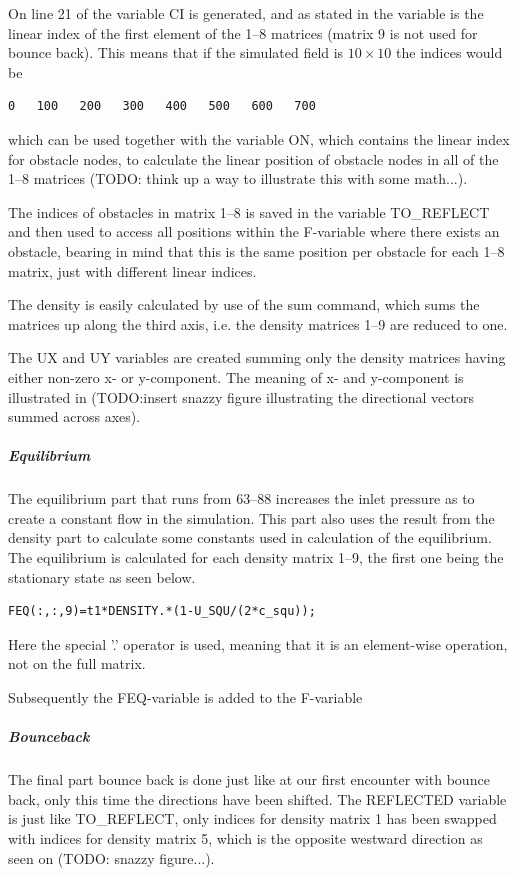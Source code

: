 On line 21 of  the variable CI is generated, and as stated in  the variable is the linear index of the first element of the 1--8 matrices (matrix 9 is not used for bounce back). This means that if the simulated field is $10\times10$ the indices would be

\begin{verbatim}
0   100   200   300   400   500   600   700
\end{verbatim}

which can be used together with the variable ON, which contains the linear index for obstacle nodes, to calculate the linear position of obstacle nodes in all of the 1--8 matrices (TODO: think up a way to illustrate this with some math...).

The indices of obstacles in matrix 1--8 is saved in the variable TO\_REFLECT and then used to access all positions within the F-variable where there exists an obstacle, bearing in mind that this is the same position per obstacle for each 1--8 matrix, just with different linear indices.

The density is easily calculated by use of the sum command, which sums the matrices up along the third axis, i.e. the density matrices 1--9 are reduced to one.

The UX and UY variables are created summing only the density matrices having either non-zero x- or y-component. The meaning of x- and y-component is illustrated in (TODO:insert snazzy figure illustrating the directional vectors summed across axes).

\subparagraph*{Equilibrium}
The equilibrium part that runs from 63--88 increases the inlet pressure as to create a constant flow in the simulation. This part also uses the result from the density part to calculate some constants used in calculation of the equilibrium. The equilibrium is calculated for each density matrix 1--9, the first one being the stationary state as seen below.

\begin{verbatim}
FEQ(:,:,9)=t1*DENSITY.*(1-U_SQU/(2*c_squ));
\end{verbatim}

Here the special '.' operator is used, meaning that it is an element-wise operation, not on the full matrix.

Subsequently the FEQ-variable is added to the F-variable

\subparagraph*{Bounceback}
The final part bounce back is done just like at our first encounter with bounce back, only this time the directions have been shifted. The REFLECTED variable is just like TO\_REFLECT, only indices for density matrix 1 has been swapped with indices for density matrix 5, which is the opposite westward direction as seen on (TODO: snazzy figure...).



